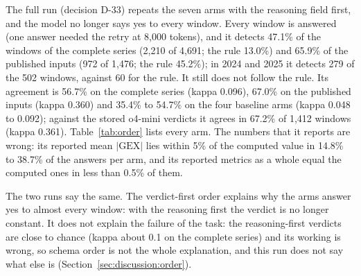 The full run (decision D-33) repeats the seven arms with the reasoning field first, and the model no longer says yes to every window. Every window is answered (one answer needed the retry at 8{,}000 tokens), and it detects 47.1\% of the windows of the complete series (2{,}210 of 4{,}691; the rule 13.0\%) and 65.9\% of the published inputs (972 of 1{,}476; the rule 45.2\%); in 2024 and 2025 it detects 279 of the 502 windows, against 60 for the rule. It still does not follow the rule. Its agreement is 56.7\% on the complete series (kappa 0.096), 67.0\% on the published inputs (kappa 0.360) and 35.4\% to 54.7\% on the four baseline arms (kappa 0.048 to 0.092); against the stored o4-mini verdicts it agrees in 67.2\% of 1{,}412 windows (kappa 0.361). Table~\ref{tab:order} lists every arm. The numbers that it reports are wrong: its reported mean $|\mathrm{GEX}|$ lies within 5\% of the computed value in 14.8\% to 38.7\% of the answers per arm, and its reported metrics as a whole equal the computed ones in less than 0.5\% of them.

The two runs say the same. The verdict-first order explains why the  arms answer yes to almost every window: with the reasoning first the verdict is no longer constant. It does not explain the failure of the task: the reasoning-first verdicts are close to chance (kappa about 0.1 on the complete series) and its working is wrong, so schema order is not the whole explanation, and this run does not say what else is (Section~\ref{sec:discussion:order}).

